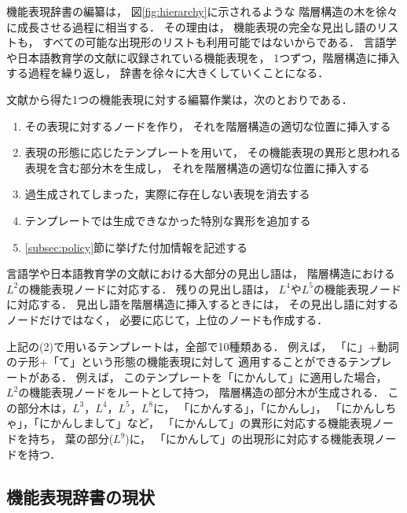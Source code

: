 \documentclass[japanese]{jnlp_1.3e}
\begin{document}
機能表現辞書の編纂は，
図\ref{fig:hierarchy}に示されるような
階層構造の木を徐々に成長させる過程に相当する．
その理由は，
機能表現の完全な見出し語のリストも，
すべての可能な出現形のリストも利用可能ではないからである．
言語学や日本語教育学の文献に収録されている機能表現を，
1つずつ，階層構造に挿入する過程を繰り返し，
辞書を徐々に大きくしていくことになる．

文献から得た1つの機能表現に対する編纂作業は，次のとおりである．
\begin{enumerate}
 \item その表現に対するノードを作り，
       それを階層構造の適切な位置に挿入する
 \item 表現の形態に応じたテンプレートを用いて，
       その機能表現の異形と思われる表現を含む部分木を生成し，
       それを階層構造の適切な位置に挿入する       
 \item 過生成されてしまった，実際に存在しない表現を消去する
 \item テンプレートでは生成できなかった特別な異形を追加する
 \item \ref{subsec:policy}節に挙げた付加情報を記述する
\end{enumerate}

言語学や日本語教育学の文献における大部分の見出し語は，
階層構造における$L^2$の機能表現ノードに対応する．
残りの見出し語は，
$L^4$や$L^5$の機能表現ノードに対応する．
見出し語を階層構造に挿入するときには，
その見出し語に対するノードだけではなく，
必要に応じて，上位のノードも作成する．


上記の(2)で用いるテンプレートは，全部で10種類ある．
例えば，
「に」+動詞のテ形+「て」という形態の機能表現に対して
適用することができるテンプレートがある．
例えば，
このテンプレートを「にかんして」に適用した場合，
$L^2$の機能表現ノードをルートとして持つ，
階層構造の部分木が生成される．
この部分木は，$L^3$，$L^4$，$L^5$，$L^8$に，
「にかんする」，「にかんし」，
「にかんしちゃ」，「にかんしまして」など，
「にかんして」の異形に対応する機能表現ノードを持ち，
葉の部分($L^9$)に，
「にかんして」の出現形に対応する機能表現ノードを持つ．

\subsection{機能表現辞書の現状}
\end{document}
